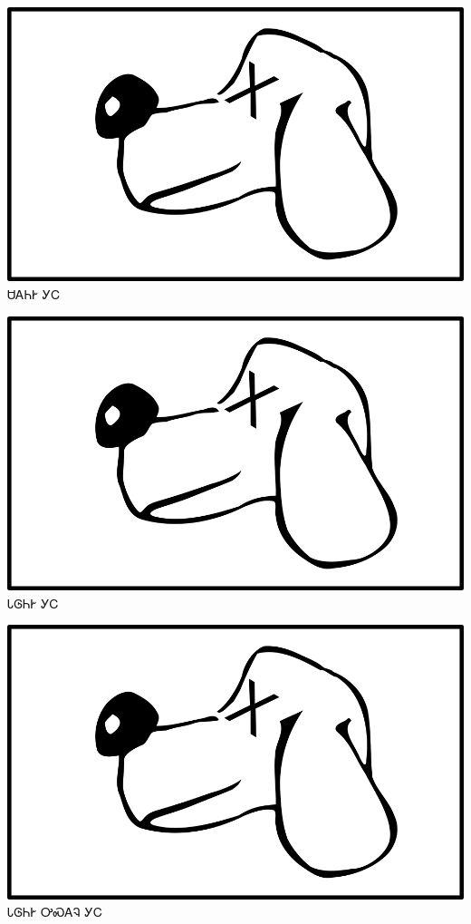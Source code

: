 \documentclass[avery5371]{flashcards}%
\begin{document}
    \begin{flashcard}{
        \includegraphics[width=0.95\columnwidth,height=.51\columnwidth,keepaspectratio]{../artwork/for-colors/gihli-dead}
    }
        \Huge ᏌᎪᏂᎨ ᎩᏟ
    \end{flashcard}

    \begin{flashcard}{
        \includegraphics[width=0.95\columnwidth,height=.51\columnwidth,keepaspectratio]{../artwork/for-colors/gihli-dead}
    }
        \Huge ᏓᎶᏂᎨ ᎩᏟ
    \end{flashcard}

    \begin{flashcard}{
        \includegraphics[width=0.95\columnwidth,height=.51\columnwidth,keepaspectratio]{../artwork/for-colors/gihli-dead}
    }
        \Huge ᏓᎶᏂᎨ ᎤᏍᎪᎸ ᎩᏟ
    \end{flashcard}
\end{document}
